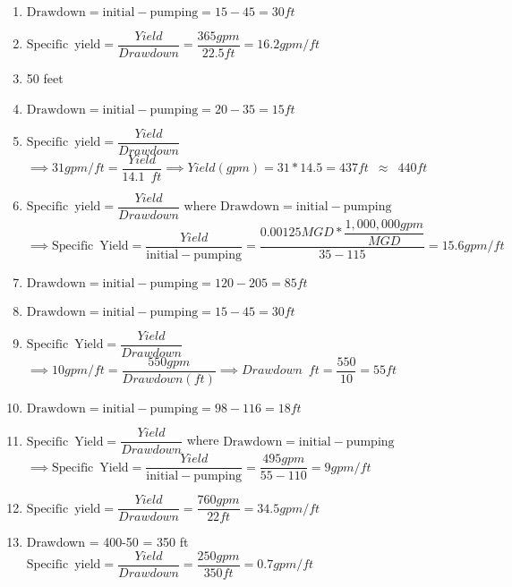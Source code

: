 \begin{enumerate}
\item 
$\mathrm{Drawdown} = \mathrm{initial-pumping} = 15 - 45 = \boxed{30 ft}$
\item 
$\mathrm{Specific \enspace yield} = \dfrac{Yield}{Drawdown}=\dfrac{365 gpm}{22.5 ft}=\boxed{16.2 gpm/ft}$
\item 
50 feet
\item 
$\mathrm{Drawdown} = \mathrm{initial-pumping} = 20 - 35 = \boxed{15 ft}$
\item 
$\mathrm{Specific \enspace  yield} = \dfrac{Yield}{Drawdown}$\\
\vspace{0.2cm}
$\implies 31 gpm/ft=\dfrac{Yield}{14.1 \enspace ft} \implies Yield (gpm)=31*14.5=\boxed{437 ft \enspace \approx \enspace 440 ft}$
\item 
$\mathrm{Specific \enspace yield} = \dfrac{Yield}{Drawdown}$ where $\mathrm{Drawdown} = \mathrm{initial-pumping}$\\
\vspace{0.2cm}
$\implies \mathrm{Specific \enspace Yield} = \dfrac{Yield}{\mathrm{initial-pumping}}=\dfrac{0.00125 MGD * \dfrac{1,000,000 gpm}{MGD}}{35-115}=\boxed{15.6 gpm/ft}$
\item 
$\mathrm{Drawdown} = \mathrm{initial-pumping} = 120 - 205 = \boxed{85 ft}$
\item 
$\mathrm{Drawdown} = \mathrm{initial-pumping} = 15 - 45 = \boxed{30 ft}$
\vspace{0.2cm}
\item 
$\mathrm{Specific \enspace  Yield} = \dfrac{Yield}{Drawdown}$\\
\vspace{0.2cm}
$\implies 10 gpm/ft=\dfrac{550 gpm}{Drawdown (ft)} \implies Drawdown \enspace ft=\dfrac{550}{10}=\boxed{55 ft}$
\vspace{0.2cm}
\item 
$\mathrm{Drawdown} = \mathrm{initial-pumping} = 98 - 116 = \boxed{18 ft}$
\item 
$\mathrm{Specific \enspace Yield} = \dfrac{Yield}{Drawdown}$ where $\mathrm{Drawdown} = \mathrm{initial-pumping}$\\
\vspace{0.2cm}
$\implies \mathrm{Specific \enspace Yield} = \dfrac{Yield}{\mathrm{initial-pumping}}=\dfrac{495 gpm}{55-110}=\boxed{9 gpm/ft}$
\item 
$\mathrm{Specific \enspace yield} = \dfrac{Yield}{Drawdown}=\dfrac{760 gpm}{22 ft}=\boxed{34.5 gpm/ft}$
\vspace{0.2cm}
\item 
Drawdown = 400-50 = 350 ft\\
\vspace{0.2cm}
$\mathrm{Specific \enspace yield} = \dfrac{Yield}{Drawdown}=\dfrac{250 gpm}{350 ft}=\boxed{0.7 gpm/ft}$

\end{enumerate}


